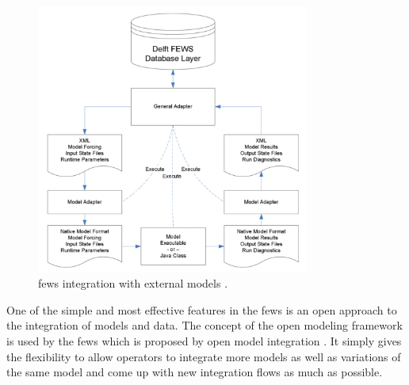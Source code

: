 \begin{figure}[htp]
    \centering
    \includegraphics[width=0.8\textwidth]{lit/fews/Linking-Delft-FEWS-with-external-models-The-fi-gure-shows-the-fl-ow-of-data-through-XML_W640.png}
    \caption[\acrshort{fews} integration with external models]{\acrshort{fews} integration with external models \cite{Werner2013TheSystem}.}
    \label{fi:fews_general_adapter}
\end{figure}
One of the simple and most effective features in the \acrshort{fews} is an open approach to the integration of models and data. The concept of the open modeling framework is used by the \acrshort{fews} which is proposed by open model integration \cite{Kokkonen2003InterfacingXML}. It simply gives the flexibility to allow operators to integrate more models as well as variations of the same model and come up with new integration flows as much as possible.
